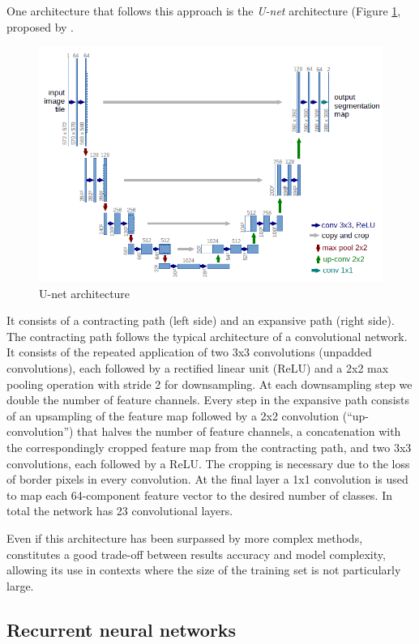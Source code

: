 One architecture that follows this approach is the \textit{U-net} architecture (Figure \ref{fig:unet_architecture}, proposed by \citep{ronneberger2015u}.
\begin{figure}
\centerline{\includegraphics[scale=0.6]{images/chapter_2/unet.png}}
\caption{U-net architecture \citep{ronneberger2015u}}
\label{fig:unet_architecture}
\end{figure}
It consists of a contracting path (left side) and an expansive path (right side). The contracting path follows the typical architecture of a convolutional network. It consists of the repeated application of two 3x3 convolutions (unpadded convolutions), each followed by a rectified linear unit (ReLU) and a 2x2 max pooling operation with stride 2 for downsampling. At each downsampling step we double the number of feature channels. Every step in the expansive path consists of an upsampling of the feature map followed by a 2x2 convolution (“up-convolution”) that halves the number of feature channels, a concatenation with the correspondingly cropped feature map from the contracting path, and two 3x3 convolutions, each followed by a ReLU. The cropping is necessary due to the loss of border pixels in every convolution. At the final layer a 1x1 convolution is used to map each 64-component feature vector to the desired number of classes. In total the network has 23 convolutional layers.

Even if this architecture has been surpassed by more complex methods, constitutes a good trade-off between results accuracy and model complexity, allowing its use in contexts where the size of the training set is not particularly large.


\subsection{Recurrent neural networks} \label{Recurrent Neural Network}

